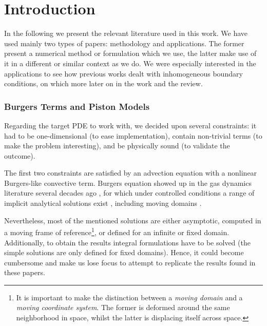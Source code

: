 \documentclass[literature_review.tex]{subfiles}
\begin{document}
\section{Introduction}

In the following we present the relevant literature used in this work.
We have used mainly two types of papers: 
methodology and applications.
The former present a numerical method or formulation 
which we use, 
the latter make use of it in a different or similar context as we do.
We were especially interested in the applications to see how
previous works dealt with inhomogeneous boundary conditions,
on which more later on in the work and the review.

\subsubsection{Burgers Terms and Piston Models}
Regarding the target PDE to work with, we decided upon several constraints:
it had to be one-dimensional (to ease implementation), 
contain non-trivial terms (to make the problem interesting),
and be physically sound (to validate the outcome).

The first two constraints are satisfied by an advection equation with 
a nonlinear Burgers-like convective term.
Burgers equation showed up in the gas dynamics literature several decades ago
\cite{BURGERS1948171,
moran_shen_1966,
1969nonlinearWavePropagationInARelaxingGas,
1951_quasiLinearParabolicEquationOcuringAerodynamics},
for which under controlled conditions 
a range of implicit analytical solutions exist \cite{1972_TableSolutionsBurgers},
including moving domains \cite{2000_burgersMovingDomainAnalytical}.

Nevertheless, most of the mentioned solutions are either asymptotic,
computed in a moving frame of reference\footnote{
    It is important to make the distinction between a \textit{moving domain}
    and a \textit{moving coordinate system}.
    The former is deformed around the same neighborhood in space,
    whilst the latter is displacing itself across space.
}, 
or defined for an infinite or fixed domain.
Additionally, to obtain the results integral formulations have to be solved 
(the simple solutions are only defined for fixed domains).
Hence, it could become cumbersome and make us lose focus to attempt to replicate
the results found in these papers.
\end{document}
